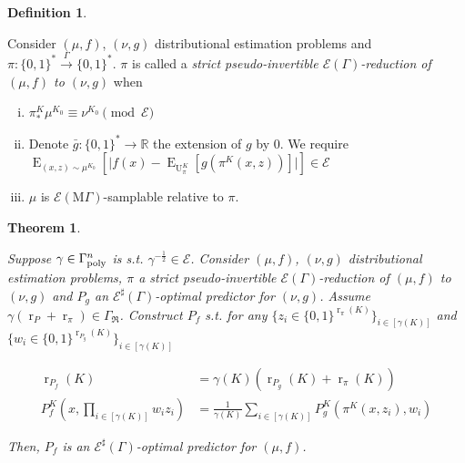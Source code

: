 \documentclass{article}
\numberwithin{equation}{section}
\theoremstyle{definition}
\newtheorem{definition}{Definition}[section]
\theoremstyle{plain}
\newtheorem{theorem}{Theorem}[section]
\newcommand{\Bool}{\{0,1\}}
\newcommand{\Words}{{\Bool^*}}
\DeclareMathOperator{\E}{E}
\DeclareMathOperator{\R}{r}
\DeclareMathOperator{\Un}{U}
\newcommand{\Reals}{\mathbb{R}}
\newcommand{\Abs}[1]{\lvert #1 \rvert}
\newcommand{\GrowR}{\Gamma_{\mathfrak{R}}}
\newcommand{\MGrow}{\mathrm{M}\Gamma}
\newcommand{\Fall}{\mathcal{E}}
\newcommand{\EG}{\Fall(\Gamma)}
\newcommand{\ESG}{\Fall^\sharp(\Gamma)}
\newcommand{\EMG}{\Fall(\MGrow)}
\newcommand{\BoolR}[1]{\Bool^{\R_{#1}(K)}}
\newcommand{\Scheme}{\xrightarrow{\Gamma}}
\begin{document}
\begin{samepage}
\begin{definition}
\label{def:sp_reduce}

Consider $(\mu,f)$, $(\nu,g)$ distributional estimation problems and ${\pi: \Words \Scheme \Words}$. $\pi$ is called a \emph{strict pseudo-invertible $\EG$-reduction of $(\mu,f)$ to $(\nu,g)$} when

\begin{enumerate}[(i)]

\item\label{con:def__sp_reduce__dist} $\pi_*^K\mu^{K_0} \equiv \nu^{K_0} \pmod \Fall$

\item\label{con:def__sp_reduce__fun} Denote ${\bar{g}: \Words \rightarrow \Reals}$ the extension of $g$ by 0. We require $\E_{(x,z) \sim \mu^{K_0}}[\Abs{f(x)-\E_{\Un_\pi^{K}}[g(\pi^{K}(x,z))]}] \in \Fall$

\item\label{con:def__sp_reduce__smp} $\mu$ is $\EMG$-samplable relative to $\pi$.

\end{enumerate}

\end{definition}
\end{samepage}

\begin{samepage}
\begin{theorem}
\label{thm:sp_reduce_sharp}

Suppose $\gamma \in \Gamma_{\textnormal{poly}}^n$ is s.t. $\gamma^{-\frac{1}{2}} \in \Fall$. Consider $(\mu,f)$, $(\nu,g)$ distributional estimation problems, $\pi$ a strict pseudo-invertible $\EG$-reduction of $(\mu, f)$ to $(\nu, g)$ and $P_g$ an $\ESG$-optimal predictor for $(\nu, g)$. Assume $\gamma (\R_P + \R_\pi) \in \GrowR$. Construct ${P_f}$ s.t. for any ${\{z_i \in \BoolR{\pi}\}_{i \in [\gamma(K)]}}$ and ${\{w_i \in \BoolR{P_g}\}_{i \in [\gamma(K)]}}$

\begin{align}
\label{eqn:thm__sp_reduce__rpf}\R_{P_f}(K) &= \gamma(K) (\R_{P_g}(K) + \R_\pi(K)) \\
\label{eqn:thm__sp_reduce__pf}P_f^K(x, \prod_{i \in [\gamma(K)]} w_i z_i) &= \frac{1}{\gamma(K)}\sum_{i \in [\gamma(K)]} P_g^K(\pi^K(x,z_i),w_i)
\end{align}

Then, $P_f$ is an $\ESG$-optimal predictor for $(\mu, f)$.

\end{theorem}
\end{samepage}
\end{document}
